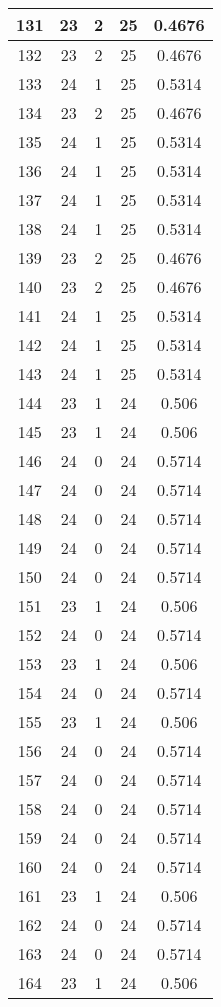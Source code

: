 \documentclass[letterpaper, 12pt]{article}
\begin{document}
\begin{longtable}{|c|c|c|c|c|}
\hline
131 & 23 & 2 & 25 & 0.4676 \\
\hline
132 & 23 & 2 & 25 & 0.4676 \\
\hline
133 & 24 & 1 & 25 & 0.5314 \\
\hline
134 & 23 & 2 & 25 & 0.4676 \\
\hline
135 & 24 & 1 & 25 & 0.5314 \\
\hline
136 & 24 & 1 & 25 & 0.5314 \\
\hline
137 & 24 & 1 & 25 & 0.5314 \\
\hline
138 & 24 & 1 & 25 & 0.5314 \\
\hline
139 & 23 & 2 & 25 & 0.4676 \\
\hline
140 & 23 & 2 & 25 & 0.4676 \\
\hline
141 & 24 & 1 & 25 & 0.5314 \\
\hline
142 & 24 & 1 & 25 & 0.5314 \\
\hline
143 & 24 & 1 & 25 & 0.5314 \\
\hline
144 & 23 & 1 & 24 & 0.506 \\
\hline
145 & 23 & 1 & 24 & 0.506 \\
\hline
146 & 24 & 0 & 24 & 0.5714 \\
\hline
147 & 24 & 0 & 24 & 0.5714 \\
\hline
148 & 24 & 0 & 24 & 0.5714 \\
\hline
149 & 24 & 0 & 24 & 0.5714 \\
\hline
150 & 24 & 0 & 24 & 0.5714 \\
\hline
151 & 23 & 1 & 24 & 0.506 \\
\hline
152 & 24 & 0 & 24 & 0.5714 \\
\hline
153 & 23 & 1 & 24 & 0.506 \\
\hline
154 & 24 & 0 & 24 & 0.5714 \\
\hline
155 & 23 & 1 & 24 & 0.506 \\
\hline
156 & 24 & 0 & 24 & 0.5714 \\
\hline
157 & 24 & 0 & 24 & 0.5714 \\
\hline
158 & 24 & 0 & 24 & 0.5714 \\
\hline
159 & 24 & 0 & 24 & 0.5714 \\
\hline
160 & 24 & 0 & 24 & 0.5714 \\
\hline
161 & 23 & 1 & 24 & 0.506 \\
\hline
162 & 24 & 0 & 24 & 0.5714 \\
\hline
163 & 24 & 0 & 24 & 0.5714 \\
\hline
164 & 23 & 1 & 24 & 0.506 \\

\end{longtable}
\end{document}
